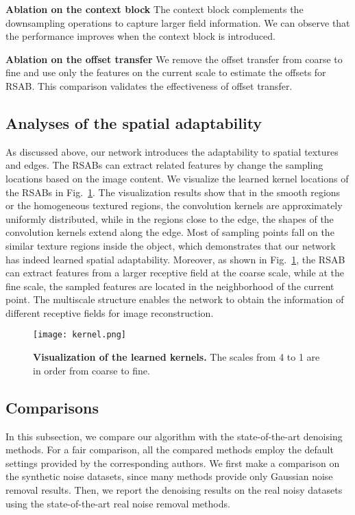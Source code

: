 \documentclass[runningheads]{llncs}
\begin{document}
\textbf{Ablation on the context block} The context block complements the downsampling operations to capture larger field information. We can observe that the performance improves when the context block is introduced.

\textbf{Ablation on the offset transfer} We remove the offset transfer from coarse to fine and use only the features on the current scale to estimate the offsets for RSAB. This comparison validates the effectiveness of offset transfer.

\subsection{Analyses of the spatial adaptability}
As discussed above, our network introduces the adaptability to spatial textures and edges. The RSABs can extract related features by change the sampling locations based on the image content. We visualize the learned kernel locations of the RSABs in Fig.~\ref{fig_kernel}. The visualization results show that in the smooth regions or the homogeneous textured regions, the convolution kernels are approximately uniformly distributed, while in the regions close to the edge, the shapes of the convolution kernels extend along the edge. Most of sampling points fall on the similar texture regions inside the object, which demonstrates that our network has indeed learned spatial adaptability. Moreover, as shown in Fig.~\ref{fig_kernel}, the RSAB can extract features from a larger receptive field at the coarse scale, while at the fine scale, the sampled features are located in the neighborhood of the current point. The multiscale structure enables the network to obtain the information of different receptive fields for image reconstruction.    

\begin{figure}[t]
\begin{center}
\texttt{[image: kernel.png]}
\end{center}
\setlength{\abovecaptionskip}{0.cm}
   \caption{\textbf{Visualization of the learned kernels.} The scales from 4 to 1 are in order from coarse to fine.}
\label{fig_kernel}
\end{figure}

\subsection{Comparisons}

In this subsection, we compare our algorithm with the state-of-the-art denoising methods. For a fair comparison, all the compared methods employ the default settings provided by the corresponding authors. We first make a comparison on the synthetic noise datasets, since many methods provide only Gaussian noise removal results. Then, we report the denoising results on the real noisy datasets using the state-of-the-art real noise removal methods.
\end{document}

